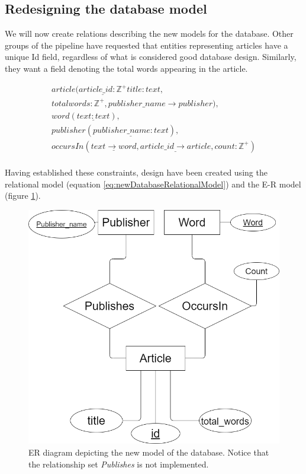 \subsection{Redesigning the database model}
We will now create relations describing the new models for the database.
Other groups of the \knox{} pipeline have requested that entities representing articles have a unique Id field, regardless of what is considered good database design.
Similarly, they want a field denoting the total words appearing in the article.

\begin{equation}\label{eq:newDatabaseRelationalModel}
    \begin{split}
        article(\underline{article\_id: \mathbb{Z^+}} title:text,\\ totalwords:\mathbb{Z^+}, publisher\_name \rightarrow publisher), \\
        word(\underline{text:text}),\\
        publisher(\underline{publisher\_name:text}),\\
        occursIn(\underline{text \rightarrow word}, \underline{article\_id \rightarrow article}, count:\mathbb{Z^+})\\
    \end{split}
\end{equation}


Having established these constraints, design have been created using the relational model (equation \ref{eq:newDatabaseRelationalModel}) and the E-R model (figure \ref{fig:newdatabaseRedesignER}).

\begin{figure}[H]
    \centering
    \includegraphics[scale=0.35]{Images/new ER.drawio.png}
    \caption{ER diagram depicting the new model of the database. Notice that the relationship set \textit{Publishes} is not implemented.}
    \label{fig:newdatabaseRedesignER}
\end{figure}